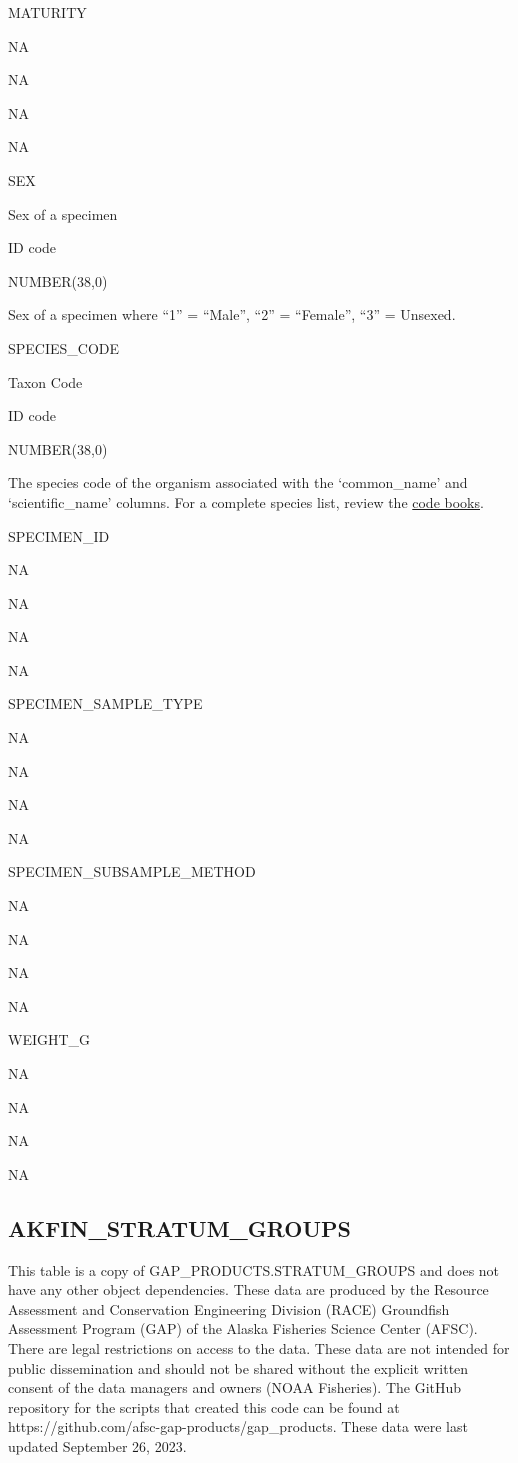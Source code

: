 \documentclass[
  letterpaper,
  oneside,
  open=any]{scrbook}
\begin{document}
MATURITY

NA

NA

NA

NA

SEX

Sex of a specimen

ID code

NUMBER(38,0)

Sex of a specimen where ``1'' = ``Male'', ``2'' = ``Female'', ``3'' =
Unsexed.

SPECIES\_CODE

Taxon Code

ID code

NUMBER(38,0)

The species code of the organism associated with the `common\_name' and
`scientific\_name' columns. For a complete species list, review the
\href{https://www.fisheries.noaa.gov/resource/document/groundfish-survey-species-code-manual-and-data-codes-manual}{code
books}.

SPECIMEN\_ID

NA

NA

NA

NA

SPECIMEN\_SAMPLE\_TYPE

NA

NA

NA

NA

SPECIMEN\_SUBSAMPLE\_METHOD

NA

NA

NA

NA

WEIGHT\_G

NA

NA

NA

NA

\hypertarget{akfin_stratum_groups}{%
\subsection{AKFIN\_STRATUM\_GROUPS}\label{akfin_stratum_groups}}

This table is a copy of GAP\_PRODUCTS.STRATUM\_GROUPS and does not have
any other object dependencies. These data are produced by the Resource
Assessment and Conservation Engineering Division (RACE) Groundfish
Assessment Program (GAP) of the Alaska Fisheries Science Center (AFSC).
There are legal restrictions on access to the data. These data are not
intended for public dissemination and should not be shared without the
explicit written consent of the data managers and owners (NOAA
Fisheries). The GitHub repository for the scripts that created this code
can be found at https://github.com/afsc-gap-products/gap\_products.
These data were last updated September 26, 2023.
\end{document}
